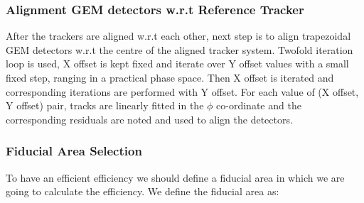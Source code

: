 \subsubsection{Alignment GEM detectors w.r.t Reference Tracker}
After the trackers are aligned w.r.t each other, next step is to align trapezoidal GEM detectors w.r.t the centre of the aligned tracker system.
Twofold iteration loop is used, X offset is kept fixed and iterate over Y offset values with a small fixed step, ranging in a practical phase space. Then X offset is iterated and corresponding iterations are performed with Y offset. For each value of (X offset, Y offset) pair, tracks are linearly fitted in the $\phi$ co-ordinate and the corresponding residuals are noted and used to align the detectors.

\subsubsection{Fiducial Area Selection} %
\label{ssub:fiducial_area_selection}
To have an efficient efficiency we should define a fiducial area in which we are going to calculate the efficiency. We define the fiducial area as:

